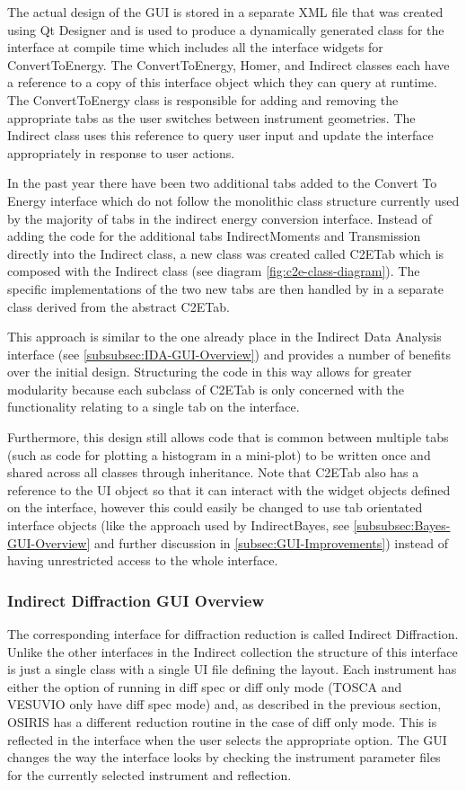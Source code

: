 \documentclass[paper=a4, fontsize=11pt]{scrartcl}	%
\numberwithin{equation}{section}															%
\numberwithin{figure}{section}																%
\numberwithin{table}{section}																%
\begin{document}
The actual design of the GUI is stored in a separate XML file that was created using Qt Designer and is used to produce a dynamically generated class for the interface at compile time which includes all the interface widgets for ConvertToEnergy. The ConvertToEnergy, Homer, and Indirect classes each have a reference to a copy of this interface object which they can query at runtime. The ConvertToEnergy class is responsible for adding and removing the appropriate tabs as the user switches between instrument geometries. The Indirect class uses this reference to query user input and update the interface appropriately in response to user actions.

In the past year there have been two additional tabs added to the Convert To Energy interface which do not follow the monolithic class structure currently used by the majority of tabs in the indirect energy conversion interface. Instead of adding the code for the additional tabs IndirectMoments and Transmission directly into the Indirect class, a new class was created called C2ETab which is composed with the Indirect class (see diagram \ref{fig:c2e-class-diagram}). The specific implementations of the two new tabs are then handled by in a separate class derived from the abstract C2ETab.

This approach is similar to the one already place in the Indirect Data Analysis interface (see \ref{subsubsec:IDA-GUI-Overview}) and provides a number of benefits over the initial design. Structuring the code in this way allows for greater modularity because each subclass of C2ETab is only concerned with the functionality relating to a single tab on the interface.

Furthermore, this design still allows code that is common between multiple tabs (such as code for plotting a histogram in a mini-plot) to be written once and shared across all classes through inheritance. Note that C2ETab also has a reference to the UI object so that it can interact with the widget objects defined on the interface, however this could easily be changed to use tab orientated interface objects (like the approach used by IndirectBayes, see \ref{subsubsec:Bayes-GUI-Overview} and further discussion in \ref{subsec:GUI-Improvements}) instead of having unrestricted access to the whole interface.

\subsubsection{Indirect Diffraction GUI Overview}
The corresponding interface for diffraction reduction is called Indirect Diffraction. Unlike the other interfaces in the Indirect collection the structure of this interface is just a single class with a single UI file defining the layout. Each instrument has either the option of running in diff spec or diff only mode (TOSCA and VESUVIO only have diff spec mode) and, as described in the previous section, OSIRIS has a different reduction routine in the case of diff only mode. This is reflected in the interface when the user selects the appropriate option. The GUI changes the way the interface looks by checking the instrument parameter files for the currently selected instrument and reflection.
\end{document}
